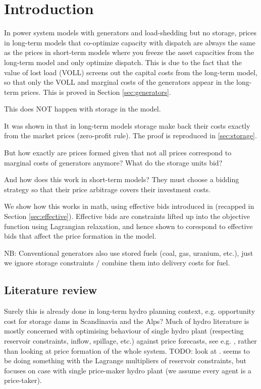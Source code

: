 \documentclass[final,3p,times]{elsarticle}
\begin{document}
\section{Introduction}

In power system models with generators and load-shedding but no
storage, prices in long-term models that co-optimize capacity with
dispatch are always the same as the prices in short-term models where
you freeze the asset capacities from the long-term model and only
optimize dispatch. This is due to the fact that the value of lost load
(VOLL) screens out the capital costs from the long-term model, so that
only the VOLL and marginal costs of the generators appear in the
long-term prices. This is proved in Section \ref{sec:generators}.

This does NOT happen with storage in the model.

It was shown in \cite{Brown2020} that in long-term models storage make
back their costs exactly from the market prices (zero-profit rule). The proof is reproduced in \ref{sec:storage}.

But how exactly are prices formed given that not all prices
correspond to marginal costs of generators anymore? What do the storage units
bid?

And how does this work in short-term models? They must choose a bidding strategy so that their price arbitrage covers their investment costs.

We show how this works in math, using effective bids introduced in \cite{Brown2020} (recapped in Section \ref{sec:effective}). Effective bids are constraints lifted up into the objective function using Lagrangian relaxation, and hence shown to corespond to effective bids that affect the price formation in the model.


NB: Conventional generators also use stored fuels (coal, gas, uranium, etc.), just we ignore storage constraints / combine them into delivery costs for fuel.

\subsection{Literature review}

Surely this is already done in long-term hydro planning context, e.g. opportunity cost for storage dams in Scandinavia and the Alps? Much of hydro literature is mostly concerned with optimising behaviour of single hydro plant (respecting reservoir constraints, inflow, spillage, etc.) against price forecasts, see e.g. \cite{Pereira1989,Rotting1992,Fosso1999}, rather than looking at price formation of the whole system. TODO: look at \cite{horsley2016}. \cite{Steeger2017} seems to be doing something with the Lagrange multipliers of reservoir constraints, but focuses on case with single price-maker hydro plant (we assume every agent is a price-taker).
\end{document}
